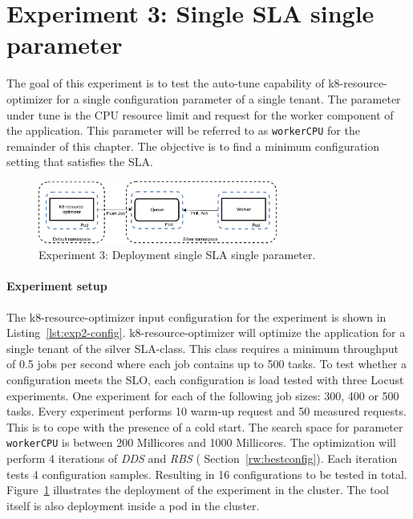 \section{Experiment 3: Single SLA  single parameter}
The goal of this experiment is to test the auto-tune capability of k8-resource-optimizer for a single configuration parameter of a single tenant. The parameter under tune is the CPU resource limit and request for the worker component of the application. This parameter will be referred to as \texttt{workerCPU} for the remainder of this chapter. The objective is to find a minimum configuration setting that satisfies the SLA.
\begin{figure}[H]
    \centering
    \includegraphics[width=0.7\textwidth]{chapter-evaluation/experiment-2-deployment.pdf}
    \caption{Experiment 3: Deployment single SLA single parameter.}
    \label{fig:exp2-deployment}
\end{figure}

\paragraph{Experiment setup}
The k8-resource-optimizer input configuration for the experiment is shown in Listing~\ref{lst:exp2-config}.
k8-resource-optimizer will optimize the  application for a single tenant of the silver SLA-class. This class requires a minimum throughput of 0.5 jobs per second where each job contains up to 500 tasks. To test whether a configuration meets the SLO, each configuration is load tested with three Locust experiments. One experiment for each of the following job sizes:  300, 400 or 500 tasks. Every experiment performs 10 warm-up request and 50 measured requests. This is to cope with the presence of a cold start. The search space for parameter \texttt{workerCPU} is between 200 Millicores and 1000 Millicores. The optimization will perform 4 iterations of \textit{DDS} and \textit{RBS} ( Section~\ref{rw:bestconfig}). Each iteration tests 4 configuration samples. Resulting in  16 configurations to be tested in total.  Figure~\ref{fig:exp2-deployment} illustrates the deployment of the experiment in the cluster. The tool itself is also deployment inside a pod in the cluster.



